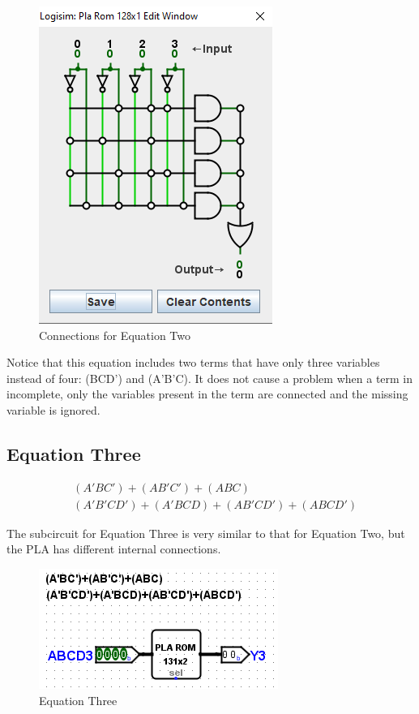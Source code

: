 \begin{figure}[H]
	\centering
	\includegraphics[width=\maxwidth{.95\linewidth}]{gfx/pla-05}
	\caption{Connections for Equation Two}
	\label{fig:pla-06}
\end{figure}

Notice that this equation includes two terms that have only three variables instead of four: (BCD') and (A'B'C). It does not cause a problem when a term in incomplete, only the variables present in the term are connected and the missing variable is ignored.

\subsection{Equation Three}

\begin{align}
	\label{eq:pla-03}
	&(A'BC')+(AB'C')+(ABC) \\
	\nonumber
	&(A'B'CD')+(A'BCD)+(AB'CD')+(ABCD')
\end{align}

The subcircuit for Equation Three is very similar to that for Equation Two, but the \ac{PLA} has different internal connections.

\begin{figure}[H]
	\centering
	\includegraphics[width=\maxwidth{.95\linewidth}]{gfx/pla-06}
	\caption{Equation Three}
	\label{fig:pla-07}
\end{figure}

